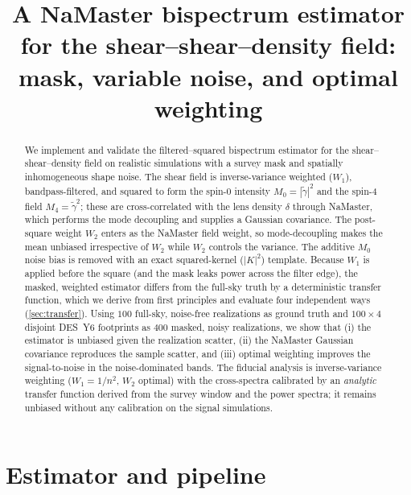 \documentclass[11pt]{article}
\title{A NaMaster bispectrum estimator for the shear--shear--density field:\\
mask, variable noise, and optimal weighting}
\author{}
\date{}
\newcommand{\Wone}{W_1}
\newcommand{\Wtwo}{W_2}
\newcommand{\dt}{\delta}
\begin{document}
\maketitle

\begin{abstract}
We implement and validate the filtered--squared bispectrum estimator for the
shear--shear--density field on realistic simulations with a survey mask and
spatially inhomogeneous shape noise. The shear field is inverse-variance
weighted ($\Wone$), bandpass-filtered, and squared to form the spin-0 intensity
$M_0=|\tilde\gamma|^2$ and the spin-4 field $M_4=\tilde\gamma^2$; these are
cross-correlated with the lens density $\dt$ through NaMaster, which performs
the mode decoupling and supplies a Gaussian covariance. The post-square weight
$\Wtwo$ enters as the NaMaster field weight, so mode-decoupling makes the mean
unbiased irrespective of $\Wtwo$ while $\Wtwo$ controls the variance. The
additive $M_0$ noise bias is removed with an exact squared-kernel ($|K|^2$)
template. Because $\Wone$ is applied before the square (and the mask leaks power
across the filter edge), the masked, weighted estimator differs from the
full-sky truth by a deterministic transfer function, which we derive from first
principles and evaluate four independent ways
(\cref{sec:transfer}). Using $100$ full-sky, noise-free realizations as ground
truth and $100\times4$ disjoint DES~Y6 footprints as $400$ masked, noisy
realizations, we show that (i) the estimator is unbiased given the realization
scatter, (ii) the NaMaster Gaussian covariance reproduces the sample scatter,
and (iii) optimal weighting improves the signal-to-noise in the noise-dominated
bands. The fiducial analysis is inverse-variance weighting ($\Wone=1/n^2$,
$\Wtwo$ optimal) with the cross-spectra calibrated by an \emph{analytic}
transfer function derived from the survey window and the power spectra; it
remains unbiased without any calibration on the signal simulations.
\end{abstract}

\section{Estimator and pipeline}
\end{document}
